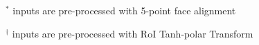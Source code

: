 \begin{table*}[ht]
\begin{center}
\begin{threeparttable}
\begin{tabular}{l|c|c|c|c|c|c|c|c}
		\end{tabular}
    	\begin{tablenotes}
    	\item $^\ast$ inputs are pre-processed with 5-point face alignment 
    	\item $^\dagger$ inputs are pre-processed with RoI Tanh-polar Transform~\cite{linRoITanhpolarTransformer2021}
    	\end{tablenotes}
	\end{threeparttable}

	\end{center}
\end{table*}

